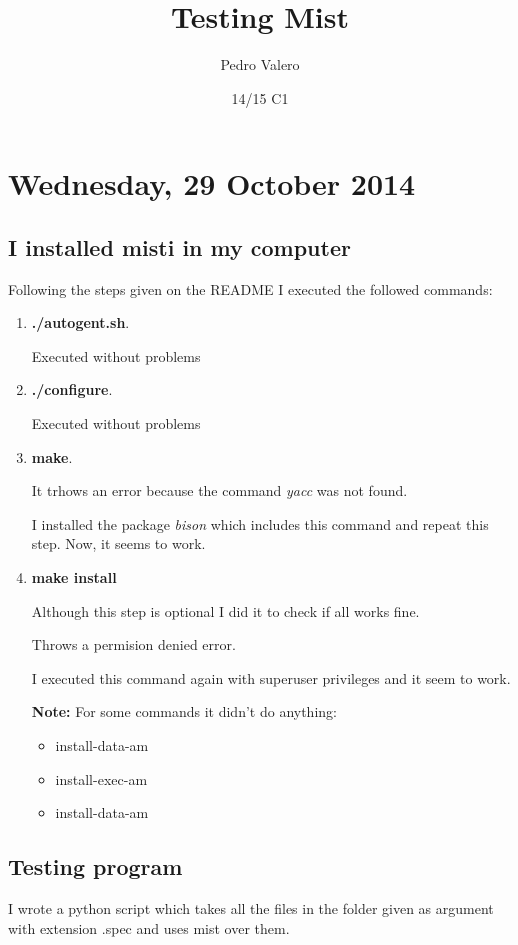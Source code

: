 \documentclass[nochap]{apuntes}
\title{Testing Mist}
\author{Pedro Valero}
\date{14/15 C1}
\begin{document}
\pagestyle{plain}
\maketitle

\tableofcontents
\newpage

\section{Wednesday, 29 October 2014}

\subsection{I installed misti in my computer}
Following the steps given on the README I executed the followed commands:
\begin{enumerate}
\item \textbf{./autogent.sh}.

Executed without problems

\item \textbf{./configure}.

Executed without problems

\item \textbf{make}.

It trhows an error because the command \textit{yacc} was not found.

I installed the package \textit{bison} which includes this command and repeat this step. Now, it seems to work.

\item \textbf{make install}

Although this step is optional I did it to check if all works fine.

Throws a permision denied error.

I executed this command again with superuser privileges and it seem to work.

\textbf{Note:} For some commands it didn't do anything:
\begin{itemize}
\item install-data-am
\item install-exec-am
\item install-data-am
\end{itemize}
\end{enumerate}

\subsection{Testing program}
I wrote a python script which takes all the files in the folder given as argument with extension .spec and uses mist over them.
\end{document}
